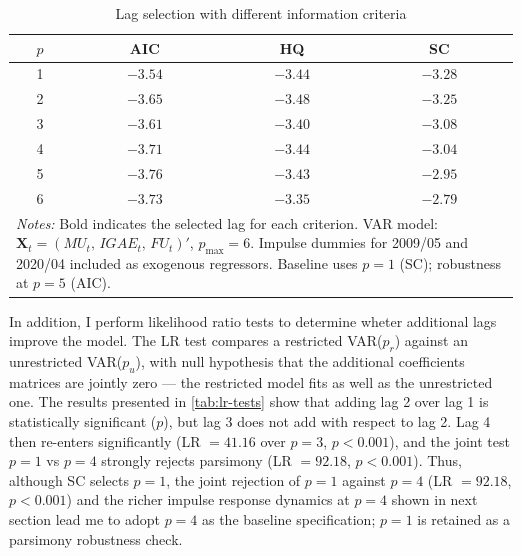 \documentclass[12pt]{article}
\begin{document}
\begin{table}[H]
\centering
\caption{Lag selection with different information criteria}\label{tab:lag-select}
\begin{tabular}{cccc}
\hline
$p$ & \textbf{AIC} & \textbf{HQ} & \textbf{SC}  \\
\hline
1 & $-3.54$ & $-3.44$ & $\mathbf{-3.28}$ \\
2 & $-3.65$ & $\mathbf{-3.48}$ & $-3.25$ \\
3 & $-3.61$ & $-3.40$ & $-3.08$ \\
4 & $-3.71$ & $-3.44$ & $-3.04$ \\
5 & $\mathbf{-3.76}$ & $-3.43$ & $-2.95$ \\
6 & $-3.73$ & $-3.35$ & $-2.79$ \\
\hline
\multicolumn{4}{l}{%
 \parbox{0.5\textwidth}{\footnotesize \textit{Notes:} Bold indicates the
  selected lag for each criterion. VAR model:
  $\mathbf{X}_t = (MU_t,\, IGAE_t,\, FU_t)'$, $p_{\max} = 6$.
  Impulse dummies for 2009/05 and 2020/04 included as exogenous regressors.
  Baseline uses $p = 1$ (SC); robustness at $p = 5$ (AIC).}} \\
\end{tabular}
\end{table}

In addition, I perform likelihood ratio tests to determine wheter additional lags improve the model. The LR test compares a restricted VAR($p_r$) against an unrestricted VAR($p_u$), with null hypothesis that the additional coefficients matrices are jointly zero --- the restricted model fits as well as the unrestricted one. The results presented in \ref{tab:lr-tests} show that adding lag 2 over lag 1 is statistically significant ($p$), but lag 3 does not add with respect to lag 2. Lag 4 then re-enters significantly (LR $= 41.16$ over $p=3$, $p < 0.001$), and the joint test $p=1$ vs $p=4$ strongly rejects parsimony (LR $= 92.18$, $p < 0.001$). Thus, although SC selects $p = 1$, the joint rejection of $p = 1$ against $p = 4$ (LR $= 92.18$, $p < 0.001$) and the richer impulse response dynamics at $p = 4$ shown in next section lead me to adopt $p = 4$ as the baseline specification; $p = 1$ is retained as a parsimony robustness check.
\end{document}
